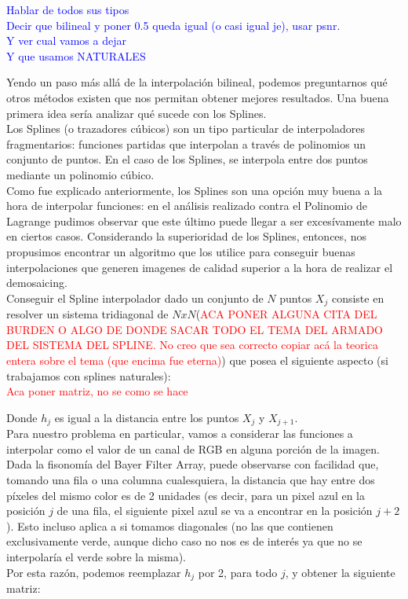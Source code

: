 \documentclass[a4paper]{article}
\begin{document}
\textcolor{blue}{Hablar de todos sus tipos\\
Decir que bilineal y poner 0.5 queda igual (o casi igual je), usar psnr.\\
Y ver cual vamos a dejar\\
Y que usamos NATURALES}

Yendo un paso más allá de la interpolación bilineal, podemos preguntarnos qué otros métodos existen que nos permitan obtener mejores resultados. Una buena primera idea sería analizar qué sucede con los Splines. \\

Los Splines (o trazadores cúbicos) son un tipo particular de interpoladores fragmentarios: funciones partidas que interpolan a través de polinomios un conjunto de puntos. En el caso de los Splines, se interpola entre dos puntos mediante un polinomio cúbico.\\

Como fue explicado anteriormente, los Splines son una opción muy buena a la hora de interpolar funciones: en el análisis realizado contra el Polinomio de Lagrange pudimos observar que este último puede llegar a ser excesívamente malo en ciertos casos. Considerando la superioridad de los Splines, entonces, nos propusimos encontrar un algoritmo que los utilice para conseguir buenas interpolaciones que generen imagenes de calidad superior a la hora de realizar el demosaicing.\\

Conseguir el Spline interpolador dado un conjunto de $N$ puntos $X_j$ consiste en resolver un sistema tridiagonal de $NxN$(\textcolor{red}{ACA PONER ALGUNA CITA DEL BURDEN O ALGO DE DONDE SACAR TODO EL TEMA DEL ARMADO DEL SISTEMA DEL SPLINE. No creo que sea correcto copiar acá la teorica entera sobre el tema (que encima fue eterna)}) que posea el siguiente aspecto (si trabajamos con splines naturales): \\

\textcolor{red}{Aca poner matriz, no se como se hace\\}

\noindent Donde $h_j$ es igual a la distancia entre los puntos $X_j$ y $X_{j+1}$. \\

Para nuestro problema en particular, vamos a considerar las funciones a interpolar como el valor de un canal de RGB en alguna porción de la imagen. Dada la fisonomía del Bayer Filter Array, puede observarse con facilidad que, tomando una fila o una columna cualesquiera, la distancia que hay entre dos píxeles del mismo color es de 2 unidades (es decir, para un pixel azul en la posición $j$ de una fila, el siguiente pixel azul se va a encontrar en la posición $j+2$). Esto incluso aplica a si tomamos diagonales (no las que contienen exclusivamente verde, aunque dicho caso no nos es de interés ya que no se interpolaría el verde sobre la misma). \\
Por esta razón, podemos reemplazar $h_j$ por 2, para todo $j$, y obtener la siguiente matriz: \\
\end{document}
